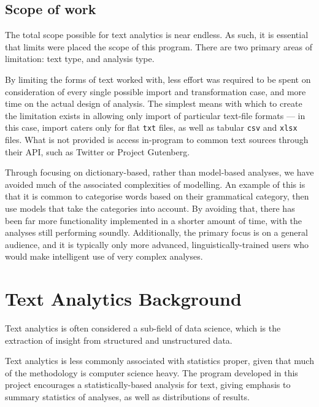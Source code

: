 \documentclass[11pt, a4paper, titlepage]{report}
\begin{document}
\section{Scope of work}\label{sec:scope-work}

The total scope possible for text analytics is near endless. As such,
it is essential that limits were placed the scope of this program.
There are two primary areas of limitation: text type, and analysis type.

By limiting the forms of text worked with, less effort was required to
be spent on consideration of every single possible import and
transformation case, and more time on the actual design of analysis.
The simplest means with which to create the limitation exists in
allowing only import of particular text-file formats --- in this case,
import caters only for flat \texttt{txt} files, as well as tabular
\texttt{csv} and \texttt{xlsx} files. What is not provided is access
in-program to common text sources through their API, such as Twitter
or Project Gutenberg.

Through focusing on dictionary-based, rather than model-based
analyses, we have avoided much of the associated complexities of
modelling. An example of this is that it is common to categorise words
based on their grammatical category, then use models that take the
categories into account. By avoiding that, there has been far more
functionality implemented in a shorter amount of time, with the
analyses still performing soundly. Additionally, the primary focus is
on a general audience, and it is typically only more advanced,
linguistically-trained users who would make intelligent use of very
complex analyses.

\chapter{Text Analytics Background}\label{cha:text-analyt-backgr}

Text analytics is often considered a sub-field of data science, which
is the extraction of insight from structured and unstructured
data\autocite{rajman1998text}.

Text analytics is less commonly associated with statistics proper,
given that much of the methodology is computer science heavy. The
program developed in this project encourages a statistically-based
analysis for text, giving emphasis to summary statistics of analyses,
as well as distributions of results.
\end{document}
